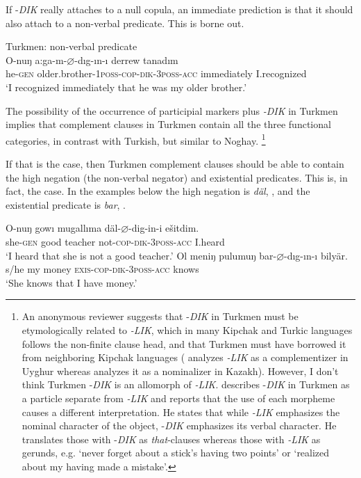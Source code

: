 \documentclass[output=paper]{langsci/langscibook}
\begin{document}
\begin{sloppypar}If -\textit{DIK} really attaches to a null copula, an immediate prediction is that it should also attach to a non-verbal predicate. 
This is borne out.\end{sloppypar}

\ea Turkmen: non-verbal predicate \\%
    \label{kelepirex:key:24}
    \gll O-nuŋ a:ga-m-$\varnothing$-dıg-ın-ı derrew tanadım\\
    he-\textsc{gen}  older.brother-1\textsc{poss}-\textsc{cop}{}-\textsc{dik}{}-\textsc{3poss-acc} immediately I.recognized\\
    \glt `I recognized immediately that he was my older brother.'
\z

The possibility of the occurrence of participial markers plus \textit{-DIK} in Turkmen implies that complement clauses in Turkmen contain all the three functional categories, in contrast with Turkish, but similar to Noghay.%
    \footnote{%
        An anonymous reviewer suggests that -\textit{DIK} in Turkmen must be etymologically related to \mbox{\textit{-LIK}}, which in many Kipchak and Turkic languages follows the non-finite clause head, and that Turkmen must have borrowed it from neighboring Kipchak languages 
        (\citet{Asarina2011} analyzes \textit{-LIK} as a complementizer in Uyghur whereas \citet{OtottKovacs2018} analyzes it as a nominalizer in Kazakh).
        However, I don't think Turkmen -\textit{DIK} is an allomorph of \textit{{}-LIK}.
        \citet[480--483]{Clark1998} describes -\textit{DIK} in Turkmen as a particle separate from \textit{{}-LIK} and reports that the use of each morpheme causes a different interpretation. 
        He states that while \textit{{}-LIK} emphasizes the nominal character of the object, -\textit{DIK} emphasizes its verbal character. 
        He translates those with -\textit{DIK} as \textit{that}{}-clauses whereas those with \textit{{}-LIK} as gerunds, 
        e.g. `never forget about a stick's having two points' or `realized about my having made a mistake'.
    } 

If that is the case, then Turkmen complement clauses should be able to contain the high negation (the non-verbal negator) and existential predicates. 
This is, in fact, the case. 
In the examples below the high negation is \textit{däl}, , and the existential predicate is \textit{bar}, .

\ea%
    \label{kelepirex:key:25}
    \gll O-nuŋ gowı mugallıma däl-$\varnothing$-dig-in-i ešitdim. \\
    she-\textsc{gen} good teacher       not-\textsc{cop}{}-\textsc{dik{}-3poss-acc} I.heard \\
    \glt `I heard that she is not a good teacher.'
\ex %
    \label{kelepirex:key:26}
    \gll Ol meniŋ pulumuŋ bar-$\varnothing$-dıg-ın-ı bilyär. \\
    s/he my       money    \textsc{exis}{}-\textsc{cop}{}-\textsc{dik{}-3poss-acc}  knows\\
    \glt `She knows that I have money.'
\z
\end{document}
